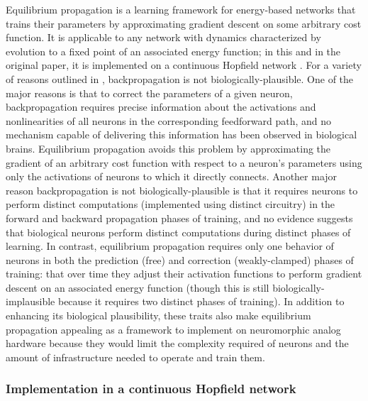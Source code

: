 \documentclass[format=sigconf]{acmart}
\begin{document}
Equilibrium propagation \cite{scellier17} is a learning framework for energy-based networks that trains their parameters by approximating gradient descent on some arbitrary cost function. It is applicable to any network with dynamics characterized by evolution to a fixed point of an associated energy function; in this and in the original paper, it is implemented on a continuous Hopfield network \cite{hopfield1984}. For a variety of reasons outlined in \cite{bengio2015}, backpropagation is not biologically-plausible. One of the major reasons is that to correct the parameters of a given neuron, backpropagation requires precise information about the activations and nonlinearities of all neurons in the corresponding feedforward path, and no mechanism capable of delivering this information has been observed in biological brains. Equilibrium propagation avoids this problem by approximating the gradient of an arbitrary cost function with respect to a neuron's parameters using only the activations of neurons to which it directly connects. Another major reason backpropagation is not biologically-plausible is that it requires neurons to perform distinct computations (implemented using distinct circuitry) in the forward and backward propagation phases of training, and no evidence suggests that biological neurons perform distinct computations during distinct phases of learning. In contrast, equilibrium propagation requires only one behavior of neurons in both the prediction (free) and correction (weakly-clamped) phases of training: that over time they adjust their activation functions to perform gradient descent on an associated energy function (though this is still biologically-implausible because it requires two distinct phases of training). In addition to enhancing its biological plausibility, these traits also make equilibrium propagation appealing as a framework to implement on neuromorphic analog hardware because they would limit the complexity required of neurons and the amount of infrastructure needed to operate and train them.

\subsubsection{Implementation in a continuous Hopfield network}
\end{document}
